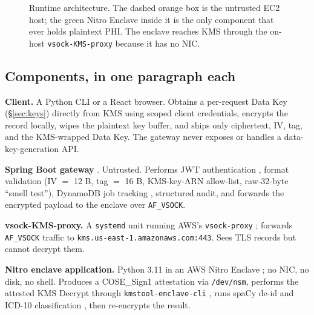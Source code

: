 \documentclass[11pt]{article}
\begin{document}
\begin{figure}[t]
{}
\caption{Runtime architecture. The dashed orange box is the
untrusted EC2 host; the green Nitro Enclave inside it is the only
component that ever holds plaintext PHI. The enclave reaches KMS
through the on-host \texttt{vsock-KMS-proxy} because it has no NIC.}
\label{fig:arch}
\end{figure}

\subsection{Components, in one paragraph each}

\textbf{Client.} A Python CLI or a React browser. Obtains a
per-request Data Key (\S\ref{sec:keys}) directly from KMS
\cite{kmsguide} using scoped client credentials, encrypts the record
locally, wipes the plaintext key buffer, and ships only ciphertext,
IV, tag, and the KMS-wrapped Data Key. The gateway never exposes or
handles a data-key-generation API.

\textbf{Spring Boot gateway} \cite{springboot}. Untrusted. Performs
JWT authentication \cite{springsec}, format validation
(IV $=$ 12 B, tag $=$ 16 B, KMS-key-ARN allow-list, raw-32-byte
``smell test''), DynamoDB job tracking \cite{ddb}, structured
audit, and forwards the encrypted payload to the enclave over
\texttt{AF\_VSOCK}.

\textbf{vsock-KMS-proxy.} A \texttt{systemd} unit running AWS's
\texttt{vsock-proxy} \cite{nitrocli}; forwards
\texttt{AF\_VSOCK} traffic to
\texttt{kms.us-east-1.amazonaws.com:443}. Sees TLS records but
cannot decrypt them.

\textbf{Nitro enclave application.} Python 3.11 in an AWS Nitro
Enclave \cite{nitroug}; no NIC, no disk, no shell. Produces a
COSE\_Sign1 attestation via \texttt{/dev/nsm}, performs the
attested KMS Decrypt through \texttt{kmstool-enclave-cli}
\cite{nitrosdk}, runs spaCy de-id \cite{spacy} and ICD-10
classification \cite{icd10}, then re-encrypts the result.
\end{document}
